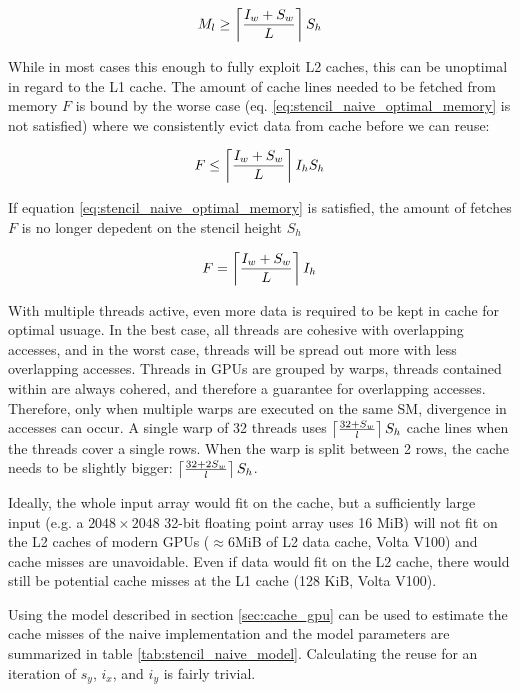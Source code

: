 \begin{equation}
    M_l \geq \left\lceil \frac{I_w + S_w}{L} \right\rceil S_h \label{eq:stencil_naive_optimal_memory}
\end{equation}

While in most cases  this enough to fully exploit L2 caches, this can be unoptimal in regard to the L1 cache.
The amount of cache lines needed to be fetched from memory $F$ is bound by the worse case (eq. \ref{eq:stencil_naive_optimal_memory} is not satisfied) where we consistently evict data from cache before we can reuse:

\[
    F \leq \left\lceil \frac{I_w + S_w}{L} \right\rceil I_h S_h
\]

If equation \ref{eq:stencil_naive_optimal_memory} is satisfied, the amount of fetches $F$ is no longer depedent on the stencil height $S_h$

\[
    F = \left\lceil \frac{I_w + S_w}{L} \right\rceil I_h
\]

With multiple threads active, even more data is required to be kept in cache for optimal usuage.
In the best case, all threads are cohesive with overlapping accesses, and in the worst case, threads will be spread out more with less overlapping accesses.
Threads in GPUs are grouped by warps, threads contained within are always cohered, and therefore a guarantee for overlapping accesses.
Therefore, only when multiple warps are executed on the same SM, divergence in accesses can occur.
A single warp of 32 threads uses $\left\lceil \frac{32 + S_w}{l} \right\rceil S_h$ cache lines when the threads cover a single rows. 
When the warp is split between 2 rows, the cache needs to be slightly bigger: $\left\lceil \frac{32 + 2 S_w}{l} \right\rceil S_h$.

Ideally, the whole input array would fit on the cache, but a sufficiently large input (e.g. a $2048\times2048$ 32-bit floating point array uses 16 MiB) will not fit on the L2 caches of modern GPUs ($\approx6$MiB of L2 data cache, Volta V100) and cache misses are unavoidable.
Even if data would fit on the L2 cache, there would still be potential cache misses at the L1 cache (128 KiB, Volta V100).


\vspace{2cm}

Using the model described in section \ref{sec:cache_gpu} can be used to estimate the cache misses of the naive implementation and the model parameters are summarized in table \ref{tab:stencil_naive_model}.
Calculating the reuse for an iteration of $s_y$, $i_x$, and $i_y$ is fairly trivial.

